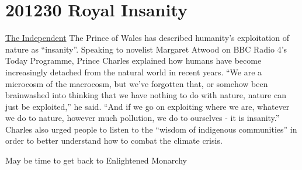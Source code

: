 \documentclass[
]{book}
\begin{document}
\hypertarget{royal-insanity}{%
\section{201230 Royal Insanity}\label{royal-insanity}}

\href{https://www.independent.co.uk/life-style/royal-family/prince-charles-radio-4-indigenous-communities-b1779998.html}{The Independent}
The Prince of Wales has described humanity's exploitation of nature as ``insanity''.
Speaking to novelist Margaret Atwood on BBC Radio 4's Today Programme, Prince Charles explained how humans have become increasingly detached from the natural world in recent years.
``We are a microcosm of the macrocosm, but we've forgotten that, or somehow been brainwashed into thinking that we have nothing to do with nature, nature can just be exploited,'' he said.
``And if we go on exploiting where we are, whatever we do to nature, however much pollution, we do to ourselves - it is insanity.''
Charles also urged people to listen to the ``wisdom of indigenous communities'' in order to better understand how to combat the climate crisis.

May be time to get back to Enlightened Monarchy

  
\end{document}

